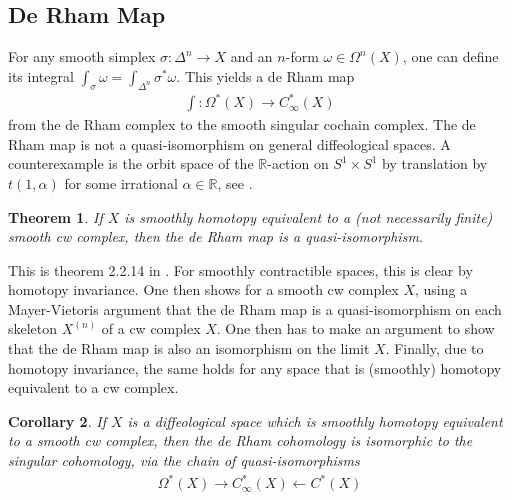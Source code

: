 \documentclass{scrartcl}
\theoremstyle{plain}
\newtheorem{theorem}{Theorem}[section]
\newtheorem{corollary}[theorem]{Corollary}
\theoremstyle{definition}
\newcommand{\R}{\mathbb R}
\newcommand{\from}{\leftarrow}
\begin{document}
\subsection{De Rham Map} For any smooth simplex $\sigma\colon \Delta^n\to X$ and an $n$-form $\omega\in\Omega^n(X)$, one can define its integral $\int_{\sigma}\omega = \int_{\Delta^n}\sigma^*\omega$.
This yields a de Rham map 
\begin{align*}
    \int\colon \Omega^*(X)\to C^*_\infty(X)
\end{align*}
from the de Rham complex to the smooth singular cochain complex.
The de Rham map is not a quasi-isomorphism on general diffeological spaces. A counterexample is the orbit space of the $\R$-action on $S^1\times S^1$ by translation by $t(1, \alpha)$ for some irrational $\alpha\in \R$, see \cite{iglesias2013diffeology}.

\begin{theorem}
    If $X$ is smoothly homotopy equivalent to a (not necessarily finite) smooth cw complex, then the de Rham map is a quasi-isomorphism.
\end{theorem}
This is theorem 2.2.14 in \cite{gurer2014topologie}. For smoothly contractible spaces, this is clear by homotopy invariance. One then shows for a smooth cw complex $X$, using a Mayer-Vietoris argument that the de Rham map is a quasi-isomorphism on each skeleton $X^{(n)}$ of a cw complex $X$. One then has to make an argument to show that the de Rham map is also an isomorphism on the limit $X$. Finally, due to homotopy invariance, the same holds for any space that is (smoothly) homotopy equivalent to a cw complex.

\begin{corollary}
    If $X$ is a diffeological space which is smoothly homotopy equivalent to a smooth cw complex, then the de Rham cohomology is isomorphic to the singular cohomology, via the chain of quasi-isomorphisms
    \begin{align*}
        \Omega^*(X) \to C^*_{\infty}(X) \from C^*(X) 
    \end{align*}
\end{corollary}
\end{document}
